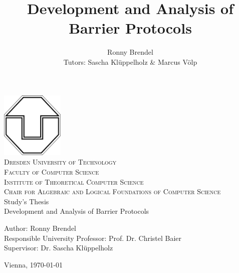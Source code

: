 \documentclass[a4paper, 10pt]{article}
\title{Development and Analysis of Barrier Protocols}
\author{Ronny Brendel\\Tutors: Sascha Kl\"uppelholz \& Marcus V\"olp}
\begin{document}
\begin{titlepage}

\begin{center}
\includegraphics[width=3cm]{tu-logo}~\\[1cm]
\textsc{\LARGE Dresden University of Technology}\\[0.5cm]
\textsc{\Large Faculty of Computer Science}\\[0.2cm]
\textsc{\large Institute of Theoretical Computer Science}\\[0.2cm]
\textsc{\large Chair for Algebraic and Logical Foundations of Computer Science}\\[3cm]
\Huge Study's Thesis \\[1cm]
\huge Development and Analysis of Barrier Protocols\\[3cm]
\end{center}

\begin{flushleft} \large
	Author: Ronny Brendel \\
	Responsible University Professor: Prof. Dr. Christel Baier \\
	Supervisor: Dr. Sascha Kl\"uppelholz
\end{flushleft}

\vfill
\begin{flushright}
	\large Vienna, \today
\end{flushright}

\end{titlepage}

\pagebreak
\newpage \thispagestyle{empty} \mbox{}
\pagebreak

\thispagestyle{empty}
\end{document}
